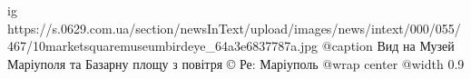  
 
 
 
 

\ifcmt
  ig https://s.0629.com.ua/section/newsInText/upload/images/news/intext/000/055/467/10marketsquaremuseumbirdeye_64a3e6837787a.jpg
	@caption Вид на Музей Маріуполя та Базарну площу з повітря © Ре: Маріуполь
  @wrap center
  @width 0.9
\fi
